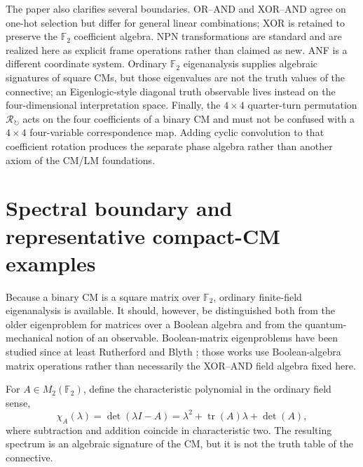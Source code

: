 \documentclass[11pt]{article}
\theoremstyle{definition}
\theoremstyle{remark}
\newcommand{\F}{\mathbb F}
\begin{document}
The paper also clarifies several boundaries.  OR--AND and XOR--AND agree on one-hot selection but differ for general linear combinations; XOR is retained to preserve the $\F_2$ coefficient algebra.  NPN transformations are standard and are realized here as explicit frame operations rather than claimed as new.  ANF is a different coordinate system.  Ordinary $\F_2$ eigenanalysis supplies algebraic signatures of square CMs, but those eigenvalues are not the truth values of the connective; an Eigenlogic-style diagonal truth observable lives instead on the four-dimensional interpretation space.  Finally, the $4\times4$ quarter-turn permutation $\mathcal R_{\circlearrowright}$ acts on the four coefficients of a binary CM and must not be confused with a $4\times4$ four-variable correspondence map.  Adding cyclic convolution to that coefficient rotation produces the separate phase algebra rather than another axiom of the CM/LM foundations.

\appendix

\section{Spectral boundary and representative compact-CM examples}
\label{sec:spectrum}

Because a binary CM is a square matrix over $\F_2$, ordinary finite-field eigenanalysis is available.  It should, however, be distinguished both from the older eigenproblem for matrices over a Boolean algebra and from the quantum-mechanical notion of an observable.  Boolean-matrix eigenproblems have been studied since at least Rutherford and Blyth \cite{Rutherford1965,Blyth1967}; those works use Boolean-algebra matrix operations rather than necessarily the XOR--AND field algebra fixed here.

For $A\in M_2(\F_2)$, define the characteristic polynomial in the ordinary field sense,
\[
 \chi_A(\lambda)=\det(\lambda I-A)
 =\lambda^2+\operatorname{tr}(A)\lambda+\det(A),
\]
where subtraction and addition coincide in characteristic two.  The resulting spectrum is an algebraic signature of the CM, but it is not the truth table of the connective.
\end{document}
